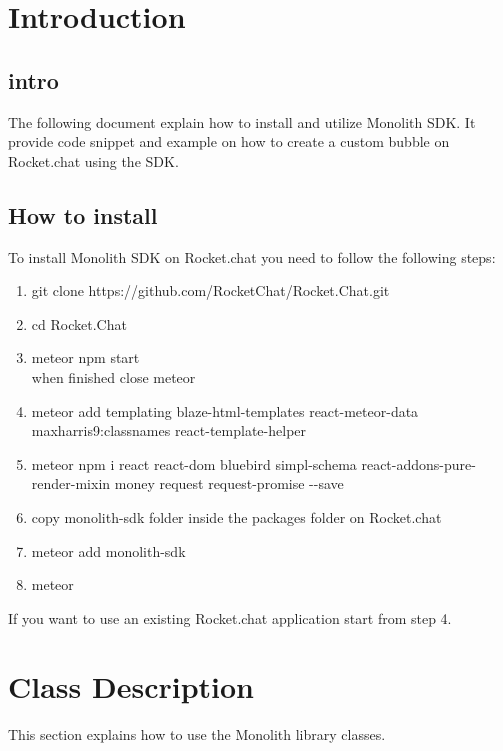 \section{Introduction}
\subsection{intro}
The following document explain how to install and utilize Monolith SDK.
It provide code snippet and example on how to create a custom bubble on Rocket.chat using the SDK.

\subsection{How to install}
To install Monolith SDK on Rocket.chat you need to follow the following steps:
\begin{enumerate}
    \item git clone https://github.com/RocketChat/Rocket.Chat.git
    \item cd Rocket.Chat
    \item meteor npm start \\ when finished close meteor
    \item meteor add templating blaze-html-templates react-meteor-data maxharris9:classnames react-template-helper
    \item meteor npm i react react-dom bluebird simpl-schema react-addons-pure-render-mixin money request request-promise  -{}-save
    \item copy monolith-sdk folder inside the packages folder on Rocket.chat
    \item meteor add monolith-sdk
    \item meteor
\end{enumerate}

\begin{flushleft}
If you want to use an existing Rocket.chat application start from step 4.
\end{flushleft}

\section{Class Description}
This section explains how to use the Monolith library classes.

